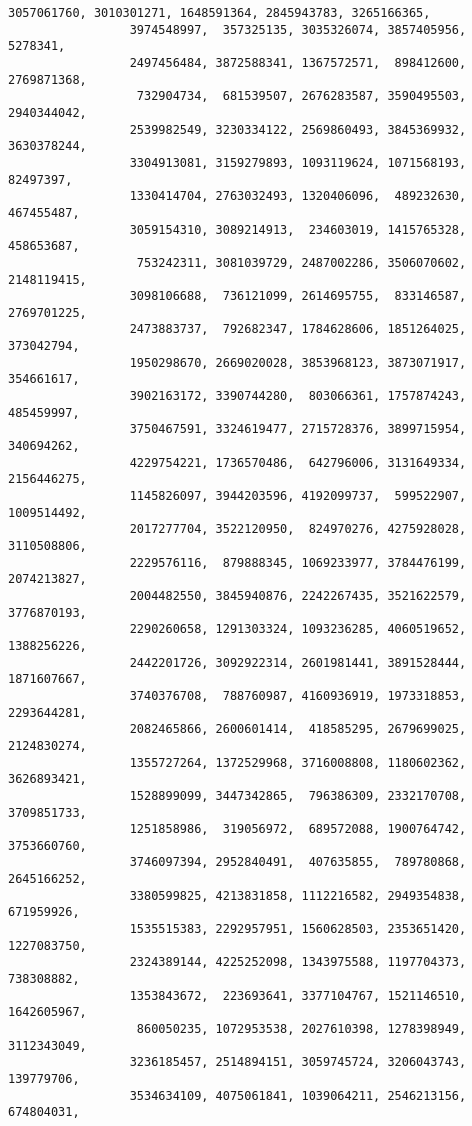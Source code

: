 \documentclass[11pt]{article}
\begin{document}
\begin{Verbatim}[commandchars=\\\{\}]
                 3057061760, 3010301271, 1648591364, 2845943783, 3265166365,
                 3974548997,  357325135, 3035326074, 3857405956,    5278341,
                 2497456484, 3872588341, 1367572571,  898412600, 2769871368,
                  732904734,  681539507, 2676283587, 3590495503, 2940344042,
                 2539982549, 3230334122, 2569860493, 3845369932, 3630378244,
                 3304913081, 3159279893, 1093119624, 1071568193,   82497397,
                 1330414704, 2763032493, 1320406096,  489232630,  467455487,
                 3059154310, 3089214913,  234603019, 1415765328,  458653687,
                  753242311, 3081039729, 2487002286, 3506070602, 2148119415,
                 3098106688,  736121099, 2614695755,  833146587, 2769701225,
                 2473883737,  792682347, 1784628606, 1851264025,  373042794,
                 1950298670, 2669020028, 3853968123, 3873071917,  354661617,
                 3902163172, 3390744280,  803066361, 1757874243,  485459997,
                 3750467591, 3324619477, 2715728376, 3899715954,  340694262,
                 4229754221, 1736570486,  642796006, 3131649334, 2156446275,
                 1145826097, 3944203596, 4192099737,  599522907, 1009514492,
                 2017277704, 3522120950,  824970276, 4275928028, 3110508806,
                 2229576116,  879888345, 1069233977, 3784476199, 2074213827,
                 2004482550, 3845940876, 2242267435, 3521622579, 3776870193,
                 2290260658, 1291303324, 1093236285, 4060519652, 1388256226,
                 2442201726, 3092922314, 2601981441, 3891528444, 1871607667,
                 3740376708,  788760987, 4160936919, 1973318853, 2293644281,
                 2082465866, 2600601414,  418585295, 2679699025, 2124830274,
                 1355727264, 1372529968, 3716008808, 1180602362, 3626893421,
                 1528899099, 3447342865,  796386309, 2332170708, 3709851733,
                 1251858986,  319056972,  689572088, 1900764742, 3753660760,
                 3746097394, 2952840491,  407635855,  789780868, 2645166252,
                 3380599825, 4213831858, 1112216582, 2949354838,  671959926,
                 1535515383, 2292957951, 1560628503, 2353651420, 1227083750,
                 2324389144, 4225252098, 1343975588, 1197704373,  738308882,
                 1353843672,  223693641, 3377104767, 1521146510, 1642605967,
                  860050235, 1072953538, 2027610398, 1278398949, 3112343049,
                 3236185457, 2514894151, 3059745724, 3206043743,  139779706,
                 3534634109, 4075061841, 1039064211, 2546213156,  674804031,

\end{Verbatim}
\end{document}
